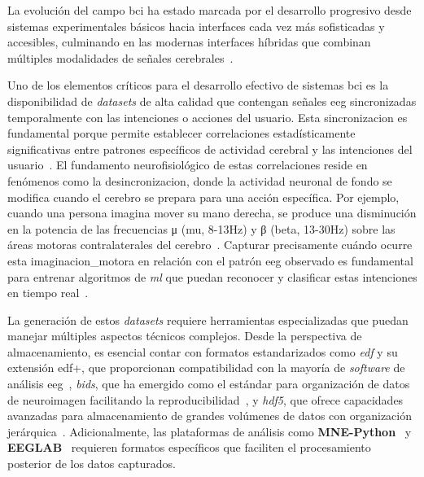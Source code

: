 La evolución del campo \acrshort{bci} ha estado marcada por el desarrollo progresivo desde sistemas experimentales básicos hacia interfaces cada vez más sofisticadas y accesibles, culminando en las modernas interfaces híbridas que combinan múltiples modalidades de señales cerebrales~\cite{pfurtscheller2010hybrid,millán2010combining}.

Uno de los elementos críticos para el desarrollo efectivo de sistemas \acrshort{bci} es la disponibilidad de \textit{\glspl{dataset}} de alta calidad que contengan señales \acrshort{eeg} sincronizadas temporalmente con las intenciones o acciones del usuario. Esta \gls{sincronizacion} es fundamental porque permite establecer correlaciones estadísticamente significativas entre patrones específicos de actividad cerebral y las intenciones del usuario~\cite{eeg_desynchronization,pfurtscheller2001motor}. El fundamento neurofisiológico de estas correlaciones reside en fenómenos como la \gls{desincronizacion}, donde la actividad neuronal de fondo se modifica cuando el cerebro se prepara para una acción específica. Por ejemplo, cuando una persona imagina mover su mano derecha, se produce una disminución en la potencia de las frecuencias μ (mu, 8-13Hz) y β (beta, 13-30Hz) sobre las áreas motoras contralaterales del cerebro~\cite{eeg_desynchronization,pfurtscheller2001motor,mcfarland2000mu}. Capturar precisamente cuándo ocurre esta \gls{imaginacion_motora} en relación con el patrón \acrshort{eeg} observado es fundamental para entrenar algoritmos de \textit{\acrfull{ml}} que puedan reconocer y clasificar estas intenciones en tiempo real~\cite{lotte2007review,blankertz2010neurophysiological}.

La generación de estos \textit{\glspl{dataset}} requiere herramientas especializadas que puedan manejar múltiples aspectos técnicos complejos. Desde la perspectiva de almacenamiento, es esencial contar con formatos estandarizados como \textit{\acrfull{edf}} y su extensión \acrshort{edf+}, que proporcionan compatibilidad con la mayoría de \textit{software} de análisis \acrshort{eeg}~\cite{kemp2003european}, \textit{\acrfull{bids}}, que ha emergido como el estándar para organización de datos de neuroimagen facilitando la reproducibilidad~\cite{bids}, y \textit{\acrfull{hdf5}}, que ofrece capacidades avanzadas para almacenamiento de grandes volúmenes de datos con organización jerárquica~\cite{folk2011overview}. Adicionalmente, las plataformas de análisis como \textbf{MNE-Python}~\cite{gramfort2013meg} y \textbf{EEGLAB}~\cite{delorme2004eeglab} requieren formatos específicos que faciliten el procesamiento posterior de los datos capturados.

